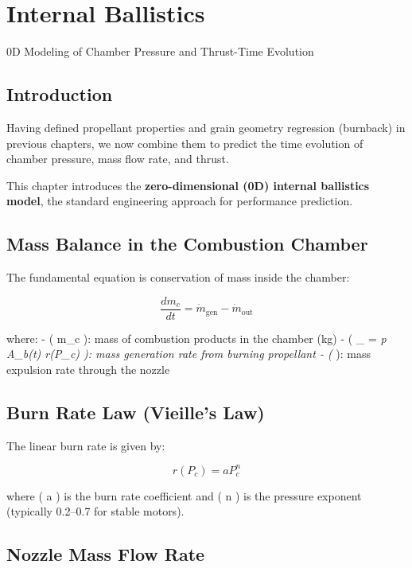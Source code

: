 \documentclass[
  letterpaper,
  DIV=11,
  numbers=noendperiod]{scrreprt}
\begin{document}
\chapter{Internal Ballistics}\label{internal-ballistics}

0D Modeling of Chamber Pressure and Thrust-Time Evolution

\hfill\break

\section{Introduction}\label{introduction-2}

Having defined propellant properties and grain geometry regression
(burnback) in previous chapters, we now combine them to predict the time
evolution of chamber pressure, mass flow rate, and thrust.

This chapter introduces the \textbf{zero-dimensional (0D) internal
ballistics model}, the standard engineering approach for performance
prediction.

\section{Mass Balance in the Combustion
Chamber}\label{mass-balance-in-the-combustion-chamber}

The fundamental equation is conservation of mass inside the chamber:

\[
\frac{dm_c}{dt} = \dot{m}_\text{gen} - \dot{m}_\text{out}
\]

where: - ( m\_c ): mass of combustion products in the chamber (kg) - (
\_ = \rho\emph{p A\_b(t) r(P\_c) ): mass generation
rate from burning propellant - ( } ): mass expulsion
rate through the nozzle

\section{Burn Rate Law (Vieille's
Law)}\label{burn-rate-law-vieilles-law}

The linear burn rate is given by:

\[
r(P_c) = a P_c^n
\]

where ( a ) is the burn rate coefficient and ( n ) is the pressure
exponent (typically 0.2--0.7 for stable motors).

\section{Nozzle Mass Flow Rate}\label{nozzle-mass-flow-rate}
\end{document}
